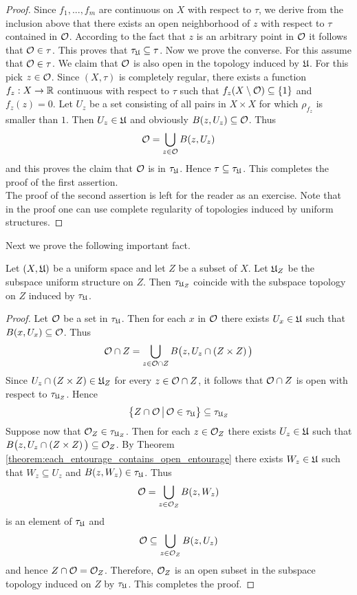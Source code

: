 \begin{proof}
Since $f_1,...,f_m$ are continuous on $X$ with respect to $\tau$, we derive from the inclusion above that there exists an open neighborhood of $z$ with respect to $\tau$ contained in ${\mathcal O}$. According to the fact that $z$ is an arbitrary point in ${\mathcal O}$ it follows that ${\mathcal O} \in \tau$. This proves that $\tau_{{\mathfrak U}}\subseteq \tau$. Now we prove the converse. For this assume that ${\mathcal O} \in \tau$. We claim that ${\mathcal O}$ is also open in the topology induced by ${\mathfrak U}$. For this pick $z \in {\mathcal O}$. Since $(X,\tau)$ is completely regular, there exists a function $f_z:X\rightarrow {\mathbb R}$ continuous with respect to $\tau$ such that $f_z(X\setminus {\mathcal O})\subseteq \{1\}$ and $f_z(z) = 0$. Let $U_z$ be a set consisting of all pairs in $X\times X$ for which $\rho_{f_z}$ is smaller than $1$. Then $U_z\in {\mathfrak U}$ and obviously $B(z,U_z)\subseteq {\mathcal O}$. Thus
$${\mathcal O} = \bigcup_{z\in {\mathcal O}}B(z,U_z)$$
and this proves the claim that ${\mathcal O}$ is in $\tau_{{\mathfrak U}}$. Hence $\tau \subseteq \tau_{{\mathfrak U}}$. This completes the proof of the first assertion.\\
The proof of the second assertion is left for the reader as an exercise. Note that in the proof one can use complete regularity of topologies induced by uniform structures.   
\end{proof}
\noindent
Next we prove the following important fact.

\begin{proposition}\label{proposition:the_induced_topology_preserves_uniform_subspaces}
Let $(X,{\mathfrak U})$ be a uniform space and let $Z$ be a subset of $X$. Let ${\mathfrak U}_Z$ be the subspace uniform structure on $Z$. Then $\tau_{{\mathfrak U}_Z}$ coincide with the subspace topology on $Z$ induced by $\tau_{{\mathfrak U}}$.
\end{proposition}
\begin{proof}
Let ${\mathcal O}$ be a set in $\tau_{{\mathfrak U}}$. Then for each $x$ in ${\mathcal O}$ there exists $U_x\in {\mathfrak U}$ such that $B(x,U_x)\subseteq {\mathcal O}$. Thus
$${\mathcal O} \cap Z = \bigcup_{z\in {\mathcal O}\cap Z}B\big(z,U_z\cap \left(Z\times Z\right)\big)$$
Since $U_z\cap \left(Z\times Z\right) \in {\mathfrak U}_Z$ for every $z \in {\mathcal O}\cap Z$, it follows that ${\mathcal O}\cap Z$ is open with respect to $\tau_{{\mathfrak U}_Z}$. Hence
$$\big\{Z\cap {\mathcal O}\,\big|\,{\mathcal O} \in \tau_{{\mathfrak U}}\big\} \subseteq \tau_{{\mathfrak U}_Z}$$
Suppose now that ${\mathcal O}_Z \in \tau_{{\mathfrak U}_Z}$. Then for each $z\in {\mathcal O}_Z$ there exists $U_z \in {\mathfrak U}$ such that $B\big(z,U_z\cap \left(Z\times Z\right)\big)\subseteq {\mathcal O}_Z$. By Theorem \ref{theorem:each_entourage_contains_open_entourage} there exists $W_z\in {\mathfrak U}$ such that $W_z\subseteq U_z$ and $B(z,W_z) \in \tau_{{\mathfrak U}}$. Thus 
$${\mathcal O} = \bigcup_{z \in {\mathcal O}_Z}B(z,W_z)$$
is an element of $\tau_{{\mathfrak U}}$ and
$${\mathcal O} \subseteq \bigcup_{z\in {\mathcal O}_Z}B(z,U_z)$$
and hence $Z\cap {\mathcal O} = {\mathcal O}_Z$. Therefore, ${\mathcal O}_Z$ is an open subset in the subspace topology induced on $Z$ by $\tau_{{\mathfrak U}}$. This completes the proof.
\end{proof}

